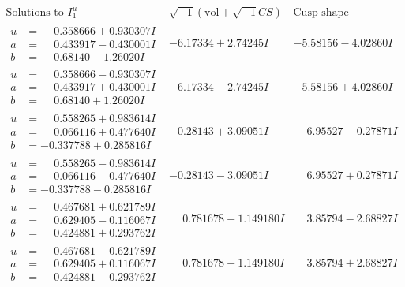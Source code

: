 \documentclass[1p]{elsarticle_modified}
\theoremstyle{definition}
\newcommand{\I}{\sqrt{-1}}
\begin{document}
$$\begin{array}{c|c|c}  
\text{Solutions to }I^u_{1}& \I (\text{vol} + \sqrt{-1}CS) & \text{Cusp shape}\\
 \hline 
\begin{aligned}
u &= \phantom{-}0.358666 + 0.930307 I \\
a &= \phantom{-}0.433917 - 0.430001 I \\
b &= \phantom{-}0.68140 - 1.26020 I\end{aligned}
 & -6.17334 + 2.74245 I & -5.58156 - 4.02860 I \\ \hline\begin{aligned}
u &= \phantom{-}0.358666 - 0.930307 I \\
a &= \phantom{-}0.433917 + 0.430001 I \\
b &= \phantom{-}0.68140 + 1.26020 I\end{aligned}
 & -6.17334 - 2.74245 I & -5.58156 + 4.02860 I \\ \hline\begin{aligned}
u &= \phantom{-}0.558265 + 0.983614 I \\
a &= \phantom{-}0.066116 + 0.477640 I \\
b &= -0.337788 + 0.285816 I\end{aligned}
 & -0.28143 + 3.09051 I & \phantom{-}6.95527 - 0.27871 I \\ \hline\begin{aligned}
u &= \phantom{-}0.558265 - 0.983614 I \\
a &= \phantom{-}0.066116 - 0.477640 I \\
b &= -0.337788 - 0.285816 I\end{aligned}
 & -0.28143 - 3.09051 I & \phantom{-}6.95527 + 0.27871 I \\ \hline\begin{aligned}
u &= \phantom{-}0.467681 + 0.621789 I \\
a &= \phantom{-}0.629405 - 0.116067 I \\
b &= \phantom{-}0.424881 + 0.293762 I\end{aligned}
 & \phantom{-}0.781678 + 1.149180 I & \phantom{-}3.85794 - 2.68827 I \\ \hline\begin{aligned}
u &= \phantom{-}0.467681 - 0.621789 I \\
a &= \phantom{-}0.629405 + 0.116067 I \\
b &= \phantom{-}0.424881 - 0.293762 I\end{aligned}
 & \phantom{-}0.781678 - 1.149180 I & \phantom{-}3.85794 + 2.68827 I \\ \hline\begin{aligned}

\end{aligned}
\end{array}$$
\end{document}
